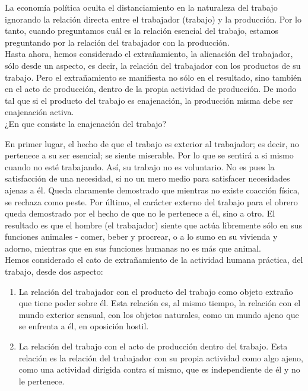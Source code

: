 La economía política oculta el distanciamiento en la naturaleza del trabajo ignorando la relación directa entre el trabajador (trabajo) y la producción. Por lo tanto, cuando preguntamos cuál es la relación esencial del trabajo, estamos preguntando por la relación del trabajador con la producción.\\

Hasta ahora, hemos considerado el extrañamiento, la alienación del trabajador, sólo desde un aspecto, es decir, la relación del trabajador con los productos de su trabajo. Pero el extrañamiento se manifiesta no sólo en el resultado, sino también en el acto de producción, dentro de la propia actividad de producción. De modo tal que si el producto del trabajo es enajenación, la producción misma debe ser enajenación activa.\\

¿En que consiste la enajenación del trabajo?

En primer lugar, el hecho de que el trabajo es exterior al trabajador; es decir, no pertenece a su ser esencial; se siente miserable. Por lo que se sentirá a si mismo cuando no esté trabajando. Así, su trabajo no es voluntario. No es pues la satisfacción de una necesidad, si no un mero medio para satisfacer necesidades ajenas a él. Queda claramente demostrado que mientras no existe coacción física, se rechaza como peste. Por último, el carácter externo del trabajo para el obrero queda demostrado por el hecho de que no le pertenece a él, sino a otro. El resultado es que el hombre (el trabajador) siente que actúa libremente sólo en sus funciones animales - comer, beber y procrear, o a lo sumo en su vivienda y adorno, mientras que en sus funciones humanas no es más que animal.\\

Hemos considerado el cato de extrañamiento de la actividad humana práctica, del trabajo, desde dos aspecto:

\begin{enumerate}[1.]
    \item La relación del trabajador con el producto del trabajo como objeto extraño que tiene poder sobre él. Esta relación es, al mismo tiempo, la relación con el mundo exterior sensual, con los objetos naturales, como un mundo ajeno que se enfrenta a él, en oposición hostil. 
    \item La relación del trabajo con el acto de producción dentro del trabajo. Esta relación es la relación del trabajador con su propia actividad como algo ajeno, como una actividad dirigida contra sí mismo, que es independiente de él y no le pertenece.
\end{enumerate}

